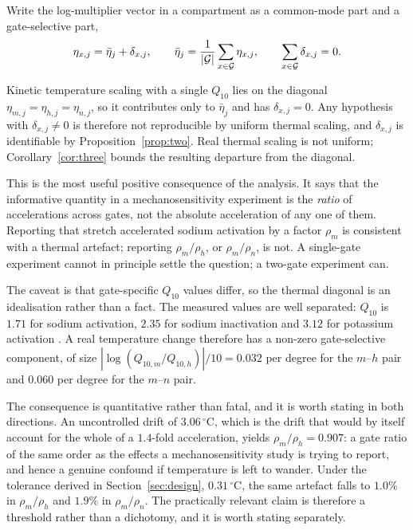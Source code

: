 Write the log-multiplier vector in a compartment as a common-mode part and a
gate-selective part,
\begin{equation}
\eta_{x,j}=\bar\eta_j+\delta_{x,j},
\qquad
\bar\eta_j=\frac{1}{|\mathcal{G}|}\sum_{x\in\mathcal{G}}\eta_{x,j},
\qquad
\sum_{x\in\mathcal{G}}\delta_{x,j}=0.
\label{eq:decomp}
\end{equation}

\begin{proposition}
\label{prop:three}
Kinetic temperature scaling with a single $Q_{10}$ lies on the diagonal
$\eta_{m,j}=\eta_{h,j}=\eta_{n,j}$, so it contributes only to $\bar\eta_j$ and
has $\delta_{x,j}=0$. Any hypothesis with $\delta_{x,j}\neq 0$ is therefore not
reproducible by uniform thermal scaling, and $\delta_{x,j}$ is identifiable by
Proposition~\ref{prop:two}. Real thermal scaling is not uniform;
Corollary~\ref{cor:three} bounds the resulting departure from the diagonal.
\end{proposition}

This is the most useful positive consequence of the analysis. It says that the
informative quantity in a mechanosensitivity experiment is the \emph{ratio} of
accelerations across gates, not the absolute acceleration of any one of them.
Reporting that stretch accelerated sodium activation by a factor $\rho_m$ is
consistent with a thermal artefact; reporting $\rho_m/\rho_h$, or
$\rho_m/\rho_n$, is not. A single-gate experiment cannot in principle settle the
question; a two-gate experiment can.

The caveat is that gate-specific $Q_{10}$ values differ, so the thermal diagonal
is an idealisation rather than a fact. The measured values are well separated:
$Q_{10}$ is $1.71$ for sodium activation, $2.35$ for sodium inactivation and
$3.12$ for potassium activation \citep{frankenhaeuser1963}. A real temperature change therefore has a
non-zero gate-selective component, of size
$\left|\log(Q_{10,m}/Q_{10,h})\right|/10=0.032$ per degree for the $m$--$h$ pair
and $0.060$ per degree for the $m$--$n$ pair.

The consequence is quantitative rather than fatal, and it is worth stating in
both directions. An uncontrolled drift of $3.06\,^{\circ}$C, which is the drift
that would by itself account for the whole of a $1.4$-fold acceleration, yields
$\rho_m/\rho_h=0.907$: a gate ratio of the same order as the effects a
mechanosensitivity study is trying to report, and hence a genuine confound if
temperature is left to wander. Under the tolerance derived in
Section~\ref{sec:design}, $0.31\,^{\circ}$C, the same artefact falls to $1.0\%$
in $\rho_m/\rho_h$ and $1.9\%$ in $\rho_m/\rho_n$. The practically relevant claim is therefore a threshold rather than a
dichotomy, and it is worth stating separately.

